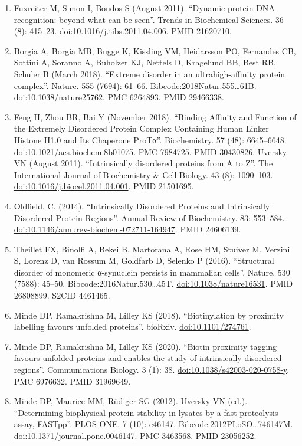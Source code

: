 \documentclass[
]{book}
\begin{document}
\begin{enumerate}
\item
  Fuxreiter M, Simon I, Bondos S (August 2011). ``Dynamic protein-DNA recognition: beyond what can be seen''. Trends in Biochemical Sciences. 36 (8): 415--23. \url{doi:10.1016/j.tibs.2011.04.006}. PMID 21620710.
\item
  Borgia A, Borgia MB, Bugge K, Kissling VM, Heidarsson PO, Fernandes CB, Sottini A, Soranno A, Buholzer KJ, Nettels D, Kragelund BB, Best RB, Schuler B (March 2018). ``Extreme disorder in an ultrahigh-affinity protein complex''. Nature. 555 (7694): 61--66. Bibcode:2018Natur.555\ldots61B. \url{doi:10.1038/nature25762}. PMC 6264893. PMID 29466338.
\item
  Feng H, Zhou BR, Bai Y (November 2018). ``Binding Affinity and Function of the Extremely Disordered Protein Complex Containing Human Linker Histone H1.0 and Its Chaperone ProTα''. Biochemistry. 57 (48): 6645--6648. \url{doi:10.1021/acs.biochem.8b01075}. PMC 7984725. PMID 30430826.
  Uversky VN (August 2011). ``Intrinsically disordered proteins from A to Z''. The International Journal of Biochemistry \& Cell Biology. 43 (8): 1090--103. \url{doi:10.1016/j.biocel.2011.04.001}. PMID 21501695.
\item
  Oldfield, C. (2014). ``Intrinsically Disordered Proteins and Intrinsically Disordered Protein Regions''. Annual Review of Biochemistry. 83: 553--584. \url{doi:10.1146/annurev-biochem-072711-164947}. PMID 24606139.
\item
  Theillet FX, Binolfi A, Bekei B, Martorana A, Rose HM, Stuiver M, Verzini S, Lorenz D, van Rossum M, Goldfarb D, Selenko P (2016). ``Structural disorder of monomeric α-synuclein persists in mammalian cells''. Nature. 530 (7588): 45--50. Bibcode:2016Natur.530\ldots45T. \url{doi:10.1038/nature16531}. PMID 26808899. S2CID 4461465.
\item
  Minde DP, Ramakrishna M, Lilley KS (2018). ``Biotinylation by proximity labelling favours unfolded proteins''. bioRxiv. \url{doi:10.1101/274761}.
\item
  Minde DP, Ramakrishna M, Lilley KS (2020). ``Biotin proximity tagging favours unfolded proteins and enables the study of intrinsically disordered regions''. Communications Biology. 3 (1): 38. \url{doi:10.1038/s42003-020-0758-y}. PMC 6976632. PMID 31969649.
\item
  Minde DP, Maurice MM, Rüdiger SG (2012). Uversky VN (ed.). ``Determining biophysical protein stability in lysates by a fast proteolysis assay, FASTpp''. PLOS ONE. 7 (10): e46147. Bibcode:2012PLoSO\ldots746147M. \url{doi:10.1371/journal.pone.0046147}. PMC 3463568. PMID 23056252.

\end{enumerate}
\end{document}
